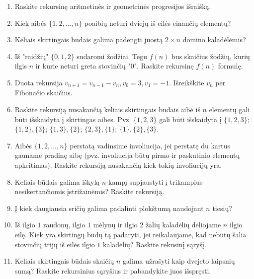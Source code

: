 \begin{enumerate}

\item Raskite rekursinę aritmetinės ir geometrinės progresijos išraišką.
    
\item Kiek aibės $\{1,2,...,n\}$ poaibių neturi dviejų iš eilės einančių elementų? 
  
\item Keliais skirtingais būdais galima padengti juostą $2\times n$ domino kaladėlėmis?
  
\item Iš "raidžių" $\{0,1,2\}$ sudaromi žodžiai. Tegu $f(n)$ bus skaičius žodžių, kurių ilgis $n$ ir kurie neturi greta stovinčių "0". Raskite rekursinę $f(n)$ formulę. 

\item Duota rekursija $v_{n+1} = v_{n-1} - v_{n}, v_0 =3, v_1=-1$. Išreikškite $v_n$ per Fibonačio skaičius.
  
\item Raskite rekursiją nusakančią keliais skirtingais būdais aibė iš $n$ elementų gali būti išskaidyta į skirtingas aibes. Pvz. $\{1,2,3\}$ gali būti išskaidyta į $\{1,2,3\}$; \hspace{0.2cm} $\{1,2\},\{3\}$;\hspace{0.2cm} $\{1,3\},\{2\}$;\hspace{0.2cm} $\{2,3\},\{1\}$;\hspace{0.2cm} $\{1\},\{2\},\{3\}.$
  
\item Aibės $\{1,2,...,n\}$ perstatą vadinsime involiucija, jei perstatę du kartus gauname pradinę aibę (pvz. involiucija būtų pirmo ir paskutinio elementų apkeitimas). Raskite rekursiją nusakančią kiek tokių involiucijų yra.

\item Keliais būdais galima iškylą $n$-kampį supjaustyti į trikampius nesikertančiomis įstrižainėmis? Raskite rekursiją.
  
\item Į kiek daugiausia sričių galima padalinti plokštumą naudojant $n$ tiesių?

\item Iš ilgio $1$ raudonų, ilgio $1$ mėlynų ir ilgio $2$ žalių kaladėlių dėliojame $n$ ilgio eilę. Kiek yra skirtingų būdų tą padaryti, jei reikalaujame, kad nebūtų šalia stovinčių trijų iš eilės ilgio $1$ kaladėlių? Raskite rekusinį sąryšį. 
  
\item Keliais skirtingais būdais skaičių $n$ galima užrašyti kaip dvejeto laipsnių sumą? Raskite rekursinius sąryšius ir pabandykite juos išspręsti.


\end{enumerate}
